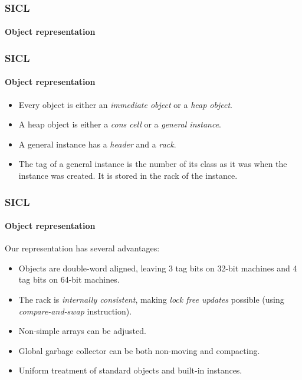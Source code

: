\documentclass{beamer}
\def\inputfig#1{}
\begin{document}
\begin{frame}
  \frametitle{SICL}
  \framesubtitle{Object representation}
  \begin{center}
\inputfig{fig-representation.pdf_t}
  \end{center}

\end{frame}
\begin{frame}
  \frametitle{SICL}
  \framesubtitle{Object representation}

  \begin{itemize}
  \item Every object is either an \emph{immediate object} or a
    \emph{heap object}.
  \item A heap object is either a \emph{cons cell} or a \emph{general
    instance}.
  \item A general instance has a \emph{header} and a \emph{rack}.
  \item The tag of a general instance is the number of its class as it
    was when the instance was created.  It is stored in the rack of
    the instance.
  \end{itemize}

\end{frame}
\begin{frame}
  \frametitle{SICL}
  \framesubtitle{Object representation}

  Our representation has several advantages:

  \begin{itemize}
  \item Objects are double-word aligned, leaving 3 tag bits on 32-bit
    machines and 4 tag bits on 64-bit machines.  
  \item The rack is \emph{internally consistent}, making \emph{lock
    free updates} possible (using \emph{compare-and-swap}
    instruction).
  \item Non-simple arrays can be adjusted. 
  \item Global garbage collector can be both non-moving and
    compacting.
  \item Uniform treatment of standard objects and built-in instances. 
  \end{itemize}

\end{frame}
\end{document}
